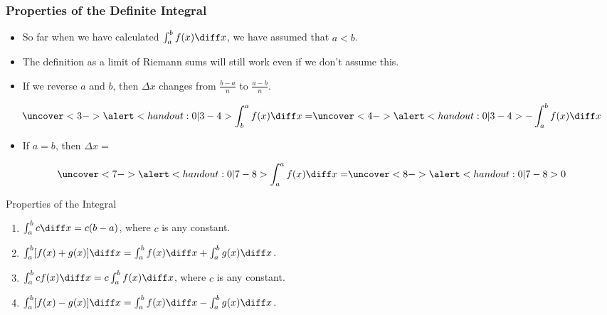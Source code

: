 \begin{frame}
\frametitle{Properties of the Definite Integral}
\begin{itemize}
\item  So far when we have calculated $\int_a^b f(x)\diff x$, we have assumed that $a < b$.
\item  The definition as a limit of Riemann sums will still work even if we don't assume this.
\item<2->  If we reverse $a$ and $b$, then $\Delta x$ changes from $\frac{b-a}{n}$ to $\frac{a-b}{n}$.
\end{itemize}
\[
\uncover<3->{%
\alert<handout:0| 3-4>{%
\int_b^a f(x)\diff x = %
}%
}%
\uncover<4->{%
\alert<handout:0| 3-4>{%
- \int_a^b f(x)\diff x %
}%
}%
\]
\begin{itemize}
\item<5-| alert@5-6>  If $a = b$, then $\Delta x = $ 
\end{itemize}
\[
\uncover<7->{%
\alert<handout:0| 7-8>{%
\int_a^a f(x) \diff x = %
}%
}%
\uncover<8->{%
\alert<handout:0| 7-8>{%
0 %
}%
}%
\]
\end{frame}

\begin{frame}
Properties of the Integral
\begin{enumerate}
\item<1-| alert@2>  $\int_a^b c\diff x = c(b-a)$, where $c$ is any constant.
\item<1-| alert@3>  $\int_a^b [f(x)+g(x)] \diff x = \int_a^b f(x)\diff x + \int_a^b g(x) \diff x$.
\item<1-| alert@4>  $\int_a^b cf(x) \diff x = c\int_a^b f(x)\diff x$, where $c$ is any constant.
\item<1-| alert@5>  $\int_a^b [f(x)-g(x)] \diff x = \int_a^b f(x)\diff x - \int_a^b g(x) \diff x$.
\end{enumerate}
\end{frame}
